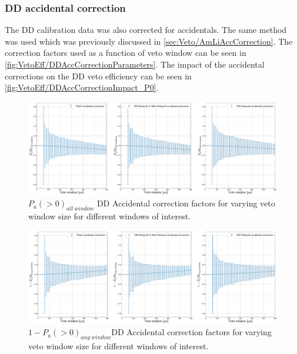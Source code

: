 \subsubsection{DD accidental correction}
The DD calibration data was also corrected for accidentals. The same method was used which was previously discussed in \autoref{sec:Veto/AmLiAccCorrection}. The correction factors used as a function of veto window can be seen in \autoref{fig:VetoEff/DDAccCorrectionParameters}.
The impact of the accidental corrections on the DD veto efficiency can be seen in \autoref{fig:VetoEff/DDAccCorrectionImpact_P0}.

\begin{figure}
	\centering
	\includegraphics[width=\textwidth]{figures/VetoEfficiency/DDAccCorrectionImpact_P0.pdf}
	\caption{$P_a(>0)_{all\:window}$ DD Accidental correction factors for varying veto window size for different windows of interest.}
	\label{fig:VetoEff/DDAccCorrectionImpact_P0}
\end{figure}

\begin{figure}
	\centering
	\includegraphics[width=\textwidth]{figures/VetoEfficiency/DDAccCorrectionImpact_1-P0.pdf}
	\caption{$1-P_a(>0)_{any\:window}$DD Accidental correction factors for varying veto window size for different windows of interest.}
	\label{fig:VetoEff/DDAccCorrectionImpact_1-P0}
\end{figure}

